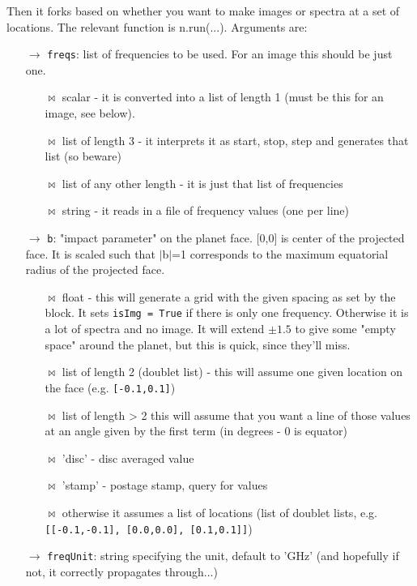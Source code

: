 \documentclass[11pt]{article}
\begin{document}
Then it forks based on whether you want to make images or spectra at a set of locations.  The relevant function is n.run(...).  Arguments are:
\begin{itemize}
\item[$\rightarrow$] \texttt{freqs}:   list of frequencies to be used. For an image this should be just one.
	\begin{itemize}
	\item[$\bowtie$] scalar - it is converted into a list of length 1 (must be this for an image, see below).
	\item[$\bowtie$] list of length 3 - it interprets it as start, stop, step and generates that list (so beware)
        \item[$\bowtie$] list of any other length - it is just that list of frequencies
        \item[$\bowtie$] string - it reads in a file of frequency values (one per line)
	\end{itemize}
\item[$\rightarrow$] \texttt{b}:  "impact parameter" on the planet face.  [0,0] is center of the projected face.  It is scaled such that $|$b$|$=1 corresponds to the maximum equatorial radius of the projected face.
	\begin{itemize}
	\item[$\bowtie$] float - this will generate a grid with the given spacing as set by the block.  It sets \texttt{isImg = True} if there is only one frequency.  Otherwise it is a lot of spectra and no image.  It will extend $\pm 1.5$ to give some "empty space" around the planet, but this is quick, since they'll miss.
	\item[$\bowtie$] list of length 2 (doublet list) - this will assume one given location on the face (e.g. \texttt{[-0.1,0.1]})
	\item[$\bowtie$] list of length > 2  this will assume that you want a line of those values at an angle given by the first term (in degrees - 0 is equator)
	\item[$\bowtie$] 'disc' - disc averaged value
	\item[$\bowtie$] 'stamp' - postage stamp, query for values
	\item[$\bowtie$] otherwise it assumes a list of locations (list of doublet lists, e.g. \texttt{[[-0.1,-0.1], }\texttt{[0.0,0.0], }\texttt{[0.1,0.1]]})
	\end{itemize}
\item[$\rightarrow$]  \texttt{freqUnit}:  string specifying the unit, default to 'GHz' (and hopefully if not, it correctly propagates through...)

\end{itemize}
\end{document}
